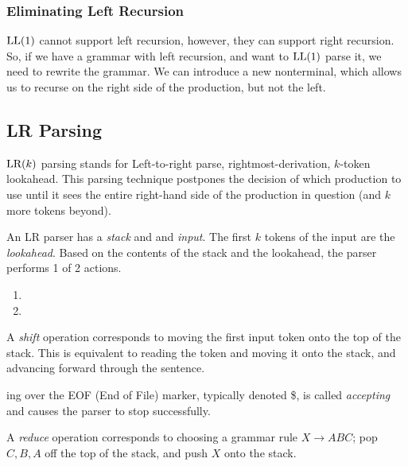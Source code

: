 \subsubsection{Eliminating Left Recursion}\label{subsubsec:Eliminate_Left_Recursion}
$\operatorname{\text{LL}}(1)$ cannot support left recursion, however, they can support right recursion.
So, if we have a grammar with left recursion, and want to $\operatorname{\text{LL}}(1)$ parse it, we need to rewrite the grammar.
We can introduce a new nonterminal, which allows us to recurse on the right side of the production, but not the left.

\subsection{LR Parsing}\label{subsec:LRParsing}
$\operatorname{\text{LR}}(k)$ parsing stands for Left-to-right parse, rightmost-derivation, $k$-token lookahead.
This parsing technique postpones the decision of which production to use until it sees the entire right-hand side of the production in question (and $k$ more tokens beyond).

An LR parser has a \emph{stack} and and \emph{input}.
The first $k$ tokens of the input are the \emph{lookahead}.
Based on the contents of the stack and the lookahead, the parser performs 1 of 2 actions.
\begin{enumerate}[noitemsep]
\item {}
\item {}
\end{enumerate}

\begin{definition}[Shift]\label{def:LR_Shift}
  A \emph{shift} operation corresponds to moving the first input token onto the top of the stack.
  This is equivalent to reading the token and moving it onto the stack, and advancing forward through the sentence.
  \begin{remark}[Accepting]\label{rmk:LR_Accept}
    ing over the EOF (End of File) marker, typically denoted \$, is called \emph{accepting} and causes the parser to stop successfully.
  \end{remark}
\end{definition}

\begin{definition}[Reduce]\label{def:LR_Reduce}
  A \emph{reduce} operation corresponds to choosing a grammar rule $X \rightarrow ABC$; pop $C, B, A$ off the top of the stack, and push $X$ onto the stack.
\end{definition}

